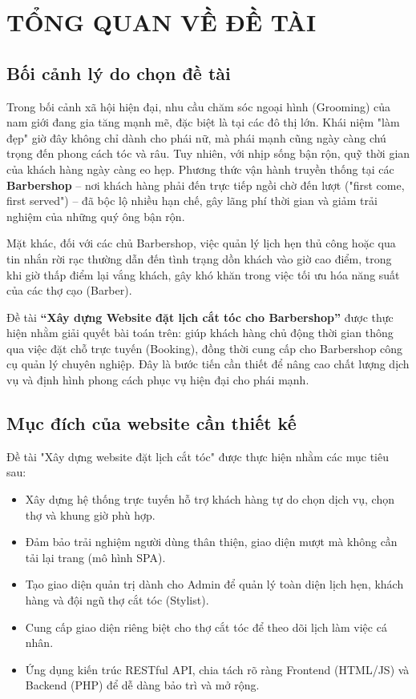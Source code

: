 \documentclass[../BTL.tex]{subfiles}
\begin{document}
\chapter{TỔNG QUAN VỀ ĐỀ TÀI}

\section{Bối cảnh lý do chọn đề tài}
Trong bối cảnh xã hội hiện đại, nhu cầu chăm sóc ngoại hình (Grooming)
của nam giới đang gia tăng mạnh mẽ, đặc biệt là tại các đô thị lớn. Khái
niệm "làm đẹp" giờ đây không chỉ dành cho phái nữ, mà phái mạnh cũng
ngày càng chú trọng đến phong cách tóc và râu. Tuy nhiên, với nhịp sống
bận rộn, quỹ thời gian của khách hàng ngày càng eo hẹp. Phương thức vận
hành truyền thống tại các \textbf{Barbershop} -- nơi khách hàng phải đến
trực tiếp ngồi chờ đến lượt ("first come, first served") -- đã bộc lộ
nhiều hạn chế, gây lãng phí thời gian và giảm trải nghiệm của những quý
ông bận rộn.

Mặt khác, đối với các chủ Barbershop, việc quản lý lịch hẹn thủ công
hoặc qua tin nhắn rời rạc thường dẫn đến tình trạng dồn khách vào giờ
cao điểm, trong khi giờ thấp điểm lại vắng khách, gây khó khăn trong
việc tối ưu hóa năng suất của các thợ cạo (Barber).

Đề tài \textbf{``Xây dựng Website đặt lịch cắt tóc cho Barbershop''}
được thực hiện nhằm giải quyết bài toán trên: giúp khách hàng chủ động
thời gian thông qua việc đặt chỗ trực tuyến (Booking), đồng thời cung
cấp cho Barbershop công cụ quản lý chuyên nghiệp. Đây là bước tiến cần
thiết để nâng cao chất lượng dịch vụ và định hình phong cách phục vụ
hiện đại cho phái mạnh.

\section{Mục đích của website cần thiết kế}
Đề tài "Xây dựng website đặt lịch cắt tóc" được thực hiện nhằm các mục
tiêu sau:

\begin{itemize}
\item
  Xây dựng hệ thống trực tuyến hỗ trợ khách hàng tự do chọn dịch vụ,
  chọn thợ và khung giờ phù hợp.
\item
  Đảm bảo trải nghiệm người dùng thân thiện, giao diện mượt mà không cần
  tải lại trang (mô hình SPA).
\item
  Tạo giao diện quản trị dành cho Admin để quản lý toàn diện lịch hẹn,
  khách hàng và đội ngũ thợ cắt tóc (Stylist).
\item
  Cung cấp giao diện riêng biệt cho thợ cắt tóc để theo dõi lịch làm
  việc cá nhân.
\item
  Ứng dụng kiến trúc RESTful API, chia tách rõ ràng Frontend (HTML/JS)
  và Backend (PHP) để dễ dàng bảo trì và mở rộng.
\end{itemize}
\end{document}

